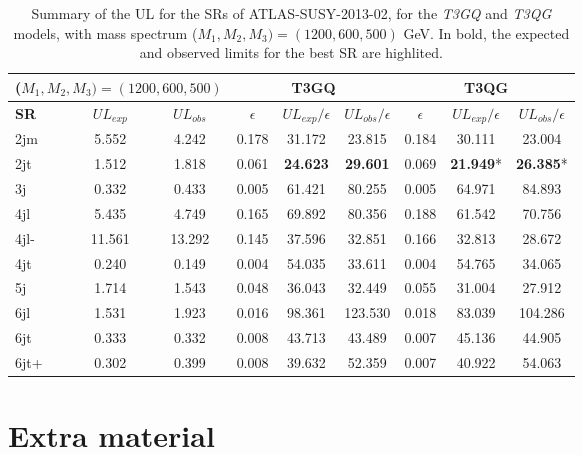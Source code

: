 \documentclass[preprint,number,sort&compress,twocolumn,3p]{elsstyarticle}
\begin{document}
\begin{table}[h]
	\centering
	\renewcommand\arraystretch{1.3} 
	\scriptsize
	\begin{tabular}{ l c c    c c c  |  c c c  }
		\toprule \toprule
		\multicolumn{3}{c}{($M_1,M_2,M_3) = (1200,600,500)$} & \multicolumn{3}{c}{ \textbf{T3GQ}} & \multicolumn{3}{c}{ \textbf{T3QG}} \\  \toprule 
		\textbf{SR} & $UL_{exp}$ & $UL_{obs}$ & $\epsilon$ &  $UL_{exp}/\epsilon$ & $UL_{obs}/\epsilon$ & $\epsilon$ & $UL_{exp}/ \epsilon$ & $UL_{obs}/ \epsilon$ \\
		2jm & 5.552 &  4.242 &  0.178	 &31.172 &	23.815		 &0.184	 &30.111	 &23.004 \\
		2jt  & 1.512  & 1.818 &  0.061& 	\textbf{24.623}	& \textbf{29.601}	& 	0.069	& \textbf{21.949}*& 	\textbf{26.385}* \\
		3j &  0.332 &  0.433  & 0.005& 	61.421& 	80.255		& 0.005	& 64.971& 	84.893 \\ 
		4jl  & 5.435 &  4.749  & 0.165	& 69.892	& 80.356	& 	0.188	& 61.542& 	70.756  \\
		4jl-  & 11.561 &  13.292 &  0.145	& 37.596	& 32.851		& 0.166	& 32.813	& 28.672 \\
		4jt  & 0.240  & 0.149  & 0.004& 	54.035	& 33.611		& 0.004	& 54.765& 	34.065  \\
		5j  & 1.714  & 1.543  &0.048	& 36.043	& 32.449	& 	0.055	& 31.004	& 27.912  \\
		6jl  & 1.531  & 1.923  & 0.016	& 98.361	& 123.530	& 	0.018	& 83.039	& 104.286 \\
		6jt &  0.333  & 0.332 &  0.008	& 43.713& 	43.489	& 	0.007	& 45.136	& 44.905  \\
		6jt+  & 0.302 &  0.399 & 0.008& 	39.632& 	52.359	& 	0.007	& 40.922	& 54.063 \\
		\bottomrule \bottomrule
	\end{tabular}
	\caption{Summary of the UL for the SRs of ATLAS-SUSY-2013-02, for the \textit{T3GQ} and \textit{T3QG} models, with mass spectrum ($M_1,M_2,M_3) = (1200,600,500)$ GeV. In bold, the expected and observed limits for the best SR are highlited.}
	\label{ATLAS02_UL_2}
\end{table}
\section*{Extra material}
\end{document}
